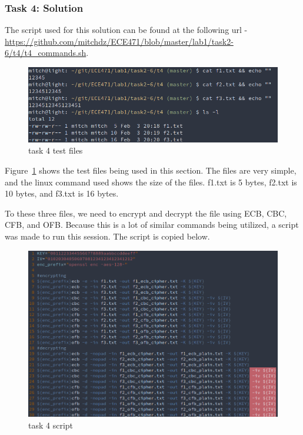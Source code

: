 \documentclass[12pt]{article}
\begin{document}
\subsubsection{Task 4: Solution}

The script used for this solution can be found at the following url -
\url{https://github.com/mitchdz/ECE471/blob/master/lab1/task2-6/t4/t4_commands.sh}.

\begin{figure}[H]
    \begin{center}
        \includegraphics[scale=0.65]{t4p0.png}
    \end{center}{}
    \caption{task 4 test files}
    \label{fig:t4p0}
\end{figure}

Figure~\ref{fig:t4p0} shows the test files being used in this section. The files are very simple, and
the linux command used shows the size of the files. f1.txt is 5 bytes, f2.txt is 10 bytes, and f3.txt
is 16 bytes.

To these three files, we need to encrypt and decrypt the file using ECB, CBC, CFB, and OFB. Because
this is a lot of similar commands being utilized, a script was made to run this session. The script is
copied below.

\begin{figure}[H]
    \begin{center}
        \includegraphics[scale=0.55]{t4p1.png}
    \end{center}{}
    \caption{task 4 script}
    \label{fig:t4p1}
\end{figure}
\end{document}
